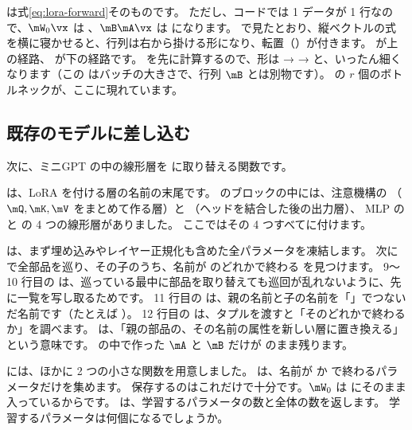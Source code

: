  は式\eqref{eq:lora-forward}そのものです。
ただし、コードでは 1 データが 1 行なので、$\mW_0\vx$ は 、$\mB\mA\vx$ は  になります。
で見たとおり、縦ベクトルの式を横に寝かせると、行列は右から掛ける形になり、転置（）が付きます。
 が上の経路、 が下の経路です。
 を先に計算するので、形は  →  →  と、いったん細くなります（この  はバッチの大きさで、行列 $\mB$ とは別物です）。
の $r$ 個のボトルネックが、ここに現れています。

\subsection{既存のモデルに差し込む}\label{sec:lora-add}

次に、ミニGPT の中の線形層を  に取り替える関数です。


 は、LoRA を付ける層の名前の末尾です。
のブロックの中には、注意機構の （$\mQ,\mK,\mV$ をまとめて作る層）と （ヘッドを結合した後の出力層）、
MLP の  と  の 4 つの線形層がありました。
ここではその 4 つすべてに付けます。

 は、まず埋め込みやレイヤー正規化も含めた全パラメータを凍結します。
次に  で全部品を巡り、その子のうち、名前が  のどれかで終わる  を見つけます。
9〜10 行目の  は、巡っている最中に部品を取り替えても巡回が乱れないように、先に一覧を写し取るためです。
11 行目の  は、親の名前と子の名前を「」でつないだ名前です（たとえば ）。
12 行目の  は、タプルを渡すと「そのどれかで終わるか」を調べます。
 は、「親の部品の、その名前の属性を新しい層に置き換える」という意味です。
 の中で作った $\mA$ と $\mB$ だけが  のまま残ります。

 には、ほかに 2 つの小さな関数を用意しました。
 は、名前が  か  で終わるパラメータだけを集めます。
保存するのはこれだけで十分です。$\mW_0$ は  にそのまま入っているからです。
 は、学習するパラメータの数と全体の数を返します。
学習するパラメータは何個になるでしょうか。

